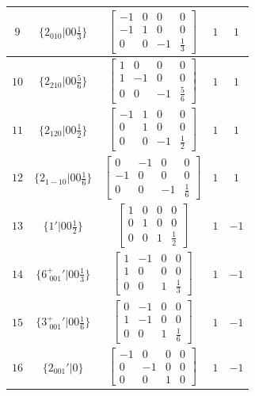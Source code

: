\documentclass[fleqn,8pt]{jsarticle}
\begin{document}
\begin{longtable}{ccccc}
$ 9 $ & $ \{2{}_{010}|0 0 \frac{1}{3}\} $ & $ \begin{bmatrix} -1 & 0 & 0 & 0 \\ -1 & 1 & 0 & 0 \\ 0 & 0 & -1 & \frac{1}{3} \end{bmatrix} $ & $ 1 $ & $ 1 $ \\ \hline
$ 10 $ & $ \{2{}_{210}|0 0 \frac{5}{6}\} $ & $ \begin{bmatrix} 1 & 0 & 0 & 0 \\ 1 & -1 & 0 & 0 \\ 0 & 0 & -1 & \frac{5}{6} \end{bmatrix} $ & $ 1 $ & $ 1 $ \\ \hline
$ 11 $ & $ \{2{}_{120}|0 0 \frac{1}{2}\} $ & $ \begin{bmatrix} -1 & 1 & 0 & 0 \\ 0 & 1 & 0 & 0 \\ 0 & 0 & -1 & \frac{1}{2} \end{bmatrix} $ & $ 1 $ & $ 1 $ \\ \hline
$ 12 $ & $ \{2{}_{1-10}|0 0 \frac{1}{6}\} $ & $ \begin{bmatrix} 0 & -1 & 0 & 0 \\ -1 & 0 & 0 & 0 \\ 0 & 0 & -1 & \frac{1}{6} \end{bmatrix} $ & $ 1 $ & $ 1 $ \\ \hline
$ 13 $ & $ \{1{}'|0 0 \frac{1}{2}\} $ & $ \begin{bmatrix} 1 & 0 & 0 & 0 \\ 0 & 1 & 0 & 0 \\ 0 & 0 & 1 & \frac{1}{2} \end{bmatrix} $ & $ 1 $ & $ -1 $ \\ \hline
$ 14 $ & $ \{6^{+}_{\,\,001}{}'|0 0 \frac{1}{3}\} $ & $ \begin{bmatrix} 1 & -1 & 0 & 0 \\ 1 & 0 & 0 & 0 \\ 0 & 0 & 1 & \frac{1}{3} \end{bmatrix} $ & $ 1 $ & $ -1 $ \\ \hline
$ 15 $ & $ \{3^{+}_{\,\,001}{}'|0 0 \frac{1}{6}\} $ & $ \begin{bmatrix} 0 & -1 & 0 & 0 \\ 1 & -1 & 0 & 0 \\ 0 & 0 & 1 & \frac{1}{6} \end{bmatrix} $ & $ 1 $ & $ -1 $ \\ \hline
$ 16 $ & $ \{2{}_{001}{}'|0\} $ & $ \begin{bmatrix} -1 & 0 & 0 & 0 \\ 0 & -1 & 0 & 0 \\ 0 & 0 & 1 & 0 \end{bmatrix} $ & $ 1 $ & $ -1 $ \\ \hline

\end{longtable}
\end{document}
